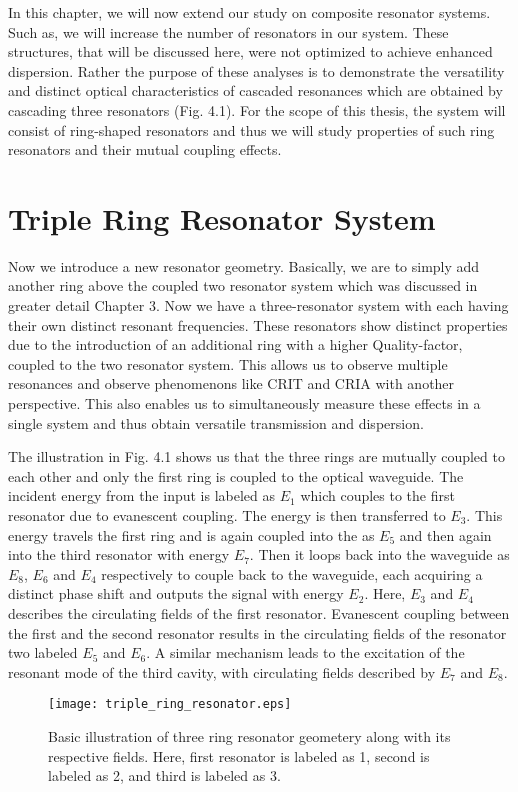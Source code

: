 In this chapter, we will now extend our study on composite resonator systems. Such as, we will increase the number of resonators in our system. These structures, that will be discussed here, were not optimized to achieve enhanced dispersion. Rather the purpose of these analyses is to demonstrate the versatility and distinct optical characteristics of cascaded resonances which are obtained by cascading three resonators (Fig. 4.1). For the scope of this thesis, the system will consist of ring-shaped resonators and thus we will study properties of such ring resonators and their mutual coupling effects.
\section{Triple Ring Resonator System}
Now we introduce a new resonator geometry. Basically, we are to simply add another ring above the coupled two resonator system which was discussed in greater detail Chapter 3. Now we have a three-resonator system with each having their own distinct resonant frequencies. These resonators show distinct properties due to the introduction of an additional ring with a higher Quality-factor, coupled to the two resonator system. This allows us to observe multiple resonances and observe phenomenons like CRIT and CRIA with another perspective. This also enables us to simultaneously measure these effects in a single system and thus obtain versatile transmission and dispersion.

The illustration in Fig. 4.1 shows us that the three rings are mutually coupled to each other and only the first ring is coupled to the optical waveguide. The incident energy from the input is labeled as $E_{1}$ which couples to the first resonator due to evanescent coupling. The energy is then transferred to $E_{3}$. This energy travels the first ring and is again coupled into the  as $E_{5}$ and then again into the third resonator with energy $E_{7}$. Then it loops back into the waveguide as $E_{8}$, $E_{6}$ and $E_{4}$ respectively to couple back to the waveguide, each acquiring a distinct phase shift and outputs the signal with energy $E_{2}$. Here, $E_{3}$ and $E_{4}$ describes the circulating fields of the first resonator. Evanescent coupling between the first and the second resonator results in the circulating fields of the resonator two labeled $E_{5}$ and $E_{6}$. A similar mechanism leads to the excitation of the resonant mode of the third cavity, with circulating fields described by $E_{7}$ and $E_{8}$.

\begin{figure}[h]
\centering
\texttt{[image: triple\_ring\_resonator.eps]}
\caption{Basic illustration of three ring resonator geometery along with its respective fields. Here, first resonator is labeled as 1, second is labeled as 2, and third is labeled as 3.}
\end{figure}

